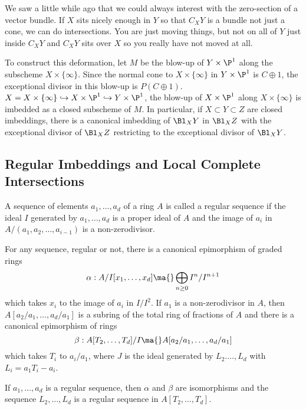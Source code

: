 We saw a little while ago that we could always interest with the zero-section of a vector bundle. If $X$ sits nicely enough in $Y$ so that $C_XY$ is a bundle not just a cone, we can do intersections. You are just moving things, but not on all of $Y$ just inside $C_XY$ and $C_XY$ sits over $X$ so you really have not moved at all. 


To construct this deformation, let $M$ be the blow-up of $Y \times \P^1$ along the subscheme $X \times \{\infty\}$. Since the normal cone to $X \times \{\infty\}$ in $Y \times \P^1$ is $C \oplus 1$, the exceptional divisor in this blow-up is $P(C \oplus 1)$. $X=X \times \{\infty\} \hookrightarrow X \times \P^1 \hookrightarrow Y \times \P^1$, the blow-up of $X \times \P^1$ along $X \times \{\infty\}$ is imbedded as a closed subscheme of $M$. In particular, if $X \subset Y \subset Z$ are closed imbeddings, there is a canonical imbedding of $\Bl_X Y$ in $\Bl_X Z$ with the exceptional divisor of $\Bl_X Z$ restricting to the exceptional divisor of $\Bl_XY$.


\subsection{Regular Imbeddings and Local Complete Intersections}


\begin{dfn}
A sequence of elements $a_1,\ldots,a_d$ of a ring $A$ is called a regular sequence if the ideal $I$ generated by $a_1,\ldots,a_d$ is a proper ideal of $A$ and the image of $a_i$ in $A/(a_1,a_2,\ldots,a_{i-1})$ is a non-zerodivisor. 
\end{dfn}

For any sequence, regular or not, there is a canonical epimorphism of graded rings 
	\[
	\alpha: A/I[x_1,\ldots,x_d] \ma{} \bigoplus_{n \geq 0} I^n/I^{n+1}
	\]
which takes $x_i$ to the image of $a_i$ in $I/I^2$. If $a_1$ is a non-zerodivisor in $A$, then $A[a_2/a_1,\ldots,a_d/a_1]$ is a subring of the total ring of fractions of $A$ and there is a canonical epimorphism of rings
	\[
	\beta: A[T_2,\ldots,T_d]/I \ma{} A[a_2/a_1,\ldots,a_d/a_1]
	\]
which takes $T_i$ to $a_i/a_1$, where $J$ is the ideal generated by $L_2.\ldots,L_d$ with $L_i=a_1T_i-a_i$. 

\begin{lem}
If $a_1,\ldots,a_d$ is a regular sequence, then $\alpha$ and $\beta$ are isomorphisms and the sequence $L_2,\ldots,L_d$ is a regular sequence in $A[T_2,\ldots,T_d]$.
\end{lem}


